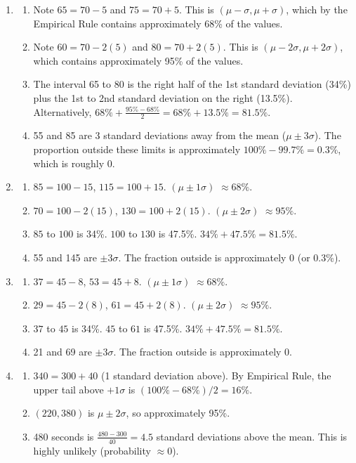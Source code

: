 \documentclass[11pt]{article}
\begin{document}
\begin{enumerate}

\item 
\begin{enumerate}
    \item Note $65 = 70 - 5$ and $75 = 70 + 5$. This is $(\mu - \sigma, \mu + \sigma)$, which by the Empirical Rule contains approximately 68\% of the values.
    \item Note $60 = 70 - 2(5)$ and $80 = 70 + 2(5)$. This is $(\mu - 2\sigma, \mu + 2\sigma)$, which contains approximately 95\% of the values.
    \item The interval 65 to 80 is the right half of the 1st standard deviation (34\%) plus the 1st to 2nd standard deviation on the right (13.5\%). Alternatively, $68\% + \frac{95\% - 68\%}{2} = 68\% + 13.5\% = 81.5\%$.
    \item 55 and 85 are 3 standard deviations away from the mean ($\mu \pm 3\sigma$). The proportion outside these limits is approximately $100\% - 99.7\% = 0.3\%$, which is roughly 0.
\end{enumerate}

\item 
\begin{enumerate}
    \item $85 = 100-15$, $115 = 100+15$. $(\mu \pm 1\sigma)$ $\approx 68\%$.
    \item $70 = 100-2(15)$, $130 = 100+2(15)$. $(\mu \pm 2\sigma)$ $\approx 95\%$.
    \item $85$ to $100$ is 34\%. $100$ to $130$ is 47.5\%. $34\% + 47.5\% = 81.5\%$.
    \item 55 and 145 are $\pm 3\sigma$. The fraction outside is approximately 0 (or 0.3\%).
\end{enumerate}

\item 
\begin{enumerate}
    \item $37 = 45-8$, $53 = 45+8$. $(\mu \pm 1\sigma)$ $\approx 68\%$.
    \item $29 = 45-2(8)$, $61 = 45+2(8)$. $(\mu \pm 2\sigma)$ $\approx 95\%$.
    \item $37$ to $45$ is 34\%. $45$ to $61$ is 47.5\%. $34\% + 47.5\% = 81.5\%$.
    \item 21 and 69 are $\pm 3\sigma$. The fraction outside is approximately 0.
\end{enumerate}

\item 
\begin{enumerate}
    \item $340 = 300 + 40$ (1 standard deviation above). By Empirical Rule, the upper tail above $+1\sigma$ is $(100\% - 68\%)/2 = 16\%$.
    \item $(220, 380)$ is $\mu \pm 2\sigma$, so approximately 95\%.
    \item 480 seconds is $\frac{480 - 300}{40} = 4.5$ standard deviations above the mean. This is highly unlikely (probability $\approx 0$).
\end{enumerate}


\end{enumerate}
\end{document}
